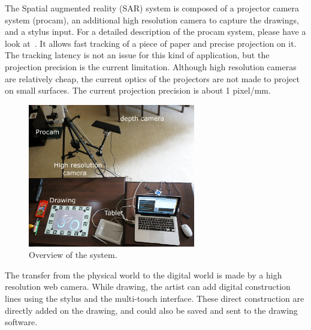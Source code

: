 \documentclass{article}
\begin{document}
The Spatial augmented reality (SAR) system is composed of a projector camera system (procam), an additional high resolution camera to capture the drawings, and a stylus input. For a detailed description of the procam system, please have a look at~\cite{laviole:2012}. It allows fast tracking of a piece of paper and precise projection on it. The tracking latency is not an issue for this kind of application, but the projection precision is the current limitation. Although high resolution cameras are relatively cheap, the current optics of the projectors are not made to project on small surfaces. The current projection precision is about 1 pixel/mm. 


\begin{figure}[tb]
\includegraphics[width = 73mm]{DSC00299-2-rogne-annote.JPG}
\caption{Overview of the system.} 
\label{fig:setup}
\end{figure}

The transfer from the physical world to the digital world is made by a high resolution web camera. 
While drawing, the artist can add digital construction lines using the stylus and the multi-touch interface. These direct construction are directly added on the drawing, and could also be saved and sent to the drawing software.  


\end{document}
